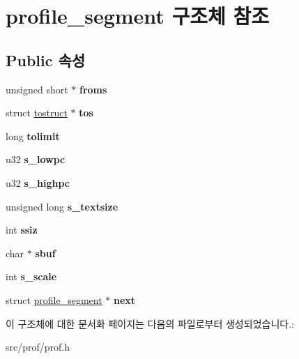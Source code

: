 \hypertarget{structprofile__segment}{}\section{profile\+\_\+segment 구조체 참조}
\label{structprofile__segment}
\subsection*{Public 속성}
\begin{DoxyCompactItemize}
\item 
\mbox{\label{structprofile__segment_a95f5dd8cfc985546636f224205f13d63}} 
unsigned short $\ast$ {\bfseries froms}
\item 
\mbox{\label{structprofile__segment_abef295486183253034168e0b10ab0145}} 
struct \mbox{\hyperlink{structtostruct}{tostruct}} $\ast$ {\bfseries tos}
\item 
\mbox{\label{structprofile__segment_ae05a2e4cec6f5e9b4d09617b1dd14154}} 
long {\bfseries tolimit}
\item 
\mbox{\label{structprofile__segment_aa8ee9d63ea20e39b677163d2de599c0a}} 
u32 {\bfseries s\+\_\+lowpc}
\item 
\mbox{\label{structprofile__segment_a7f09373641edd894f53bc8eb0133698e}} 
u32 {\bfseries s\+\_\+highpc}
\item 
\mbox{\label{structprofile__segment_abdd1f062a546f1deae937249beff75e0}} 
unsigned long {\bfseries s\+\_\+textsize}
\item 
\mbox{\label{structprofile__segment_abb1125e53b4e5c215e7a9d3fccbd0a37}} 
int {\bfseries ssiz}
\item 
\mbox{\label{structprofile__segment_a62d09b5209cad3577bfdd8b5b664c429}} 
char $\ast$ {\bfseries sbuf}
\item 
\mbox{\label{structprofile__segment_a4fafbba78188d70492831e298d7d42fc}} 
int {\bfseries s\+\_\+scale}
\item 
\mbox{\label{structprofile__segment_a105e1835554471470a91583c6da7860e}} 
struct \mbox{\hyperlink{structprofile__segment}{profile\+\_\+segment}} $\ast$ {\bfseries next}
\end{DoxyCompactItemize}


이 구조체에 대한 문서화 페이지는 다음의 파일로부터 생성되었습니다.\+:\begin{DoxyCompactItemize}
\item 
src/prof/prof.\+h\end{DoxyCompactItemize}
